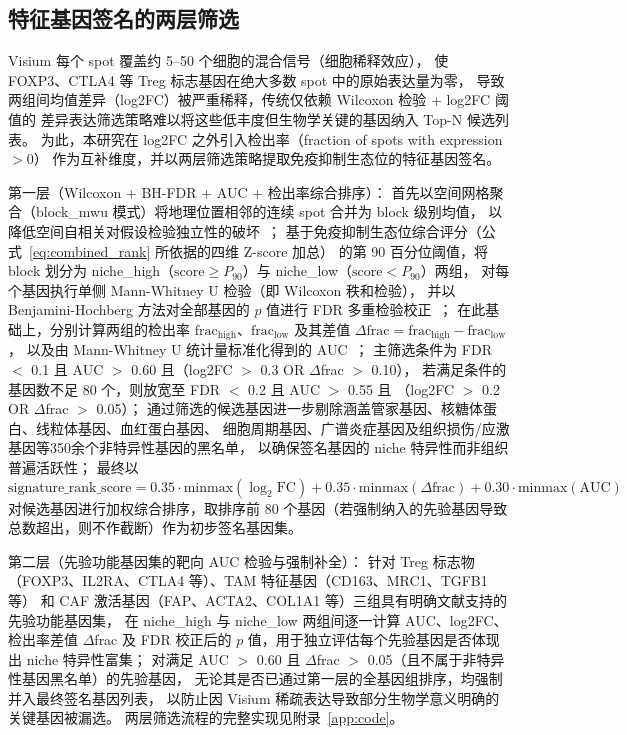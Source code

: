 \documentclass[12pt, a4paper]{ctexart}
\begin{document}
\subsection{特征基因签名的两层筛选}

Visium 每个 spot 覆盖约 5--50 个细胞的混合信号（细胞稀释效应），
使 FOXP3、CTLA4 等 Treg 标志基因在绝大多数 spot 中的原始表达量为零，
导致两组间均值差异（log2FC）被严重稀释，传统仅依赖 Wilcoxon 检验 + log2FC 阈值的
差异表达筛选策略难以将这些低丰度但生物学关键的基因纳入 Top-N 候选列表。
为此，本研究在 log2FC 之外引入检出率（fraction of spots with expression $>0$）
作为互补维度，并以两层筛选策略提取免疫抑制生态位的特征基因签名。

第一层（Wilcoxon + BH-FDR + AUC + 检出率综合排序）：
首先以空间网格聚合（block\_mwu 模式）将地理位置相邻的连续 spot 合并为 block 级别均值，
以降低空间自相关对假设检验独立性的破坏~\citep{palla2022squidpy}；
基于免疫抑制生态位综合评分（公式~\ref{eq:combined_rank} 所依据的四维 Z-score 加总）
的第 90 百分位阈值，将 block 划分为
niche\_high（$\text{score} \geq P_{90}$）与 niche\_low（$\text{score} < P_{90}$）两组，
对每个基因执行单侧 Mann-Whitney U 检验（即 Wilcoxon 秩和检验），
并以 Benjamini-Hochberg 方法对全部基因的 $p$ 值进行 FDR 多重检验校正~\citep{mann1947test}；
在此基础上，分别计算两组的检出率 $\text{frac}_{\text{high}}$、$\text{frac}_{\text{low}}$
及其差值 $\Delta\text{frac} = \text{frac}_{\text{high}} - \text{frac}_{\text{low}}$，
以及由 Mann-Whitney U 统计量标准化得到的 AUC~\citep{hanley1982meaning}；
主筛选条件为 FDR $<$ 0.1 且 AUC $>$ 0.60 且（log2FC $>$ 0.3 OR $\Delta$frac $>$ 0.10），
若满足条件的基因数不足 80 个，则放宽至 FDR $<$ 0.2 且 AUC $>$ 0.55 且
（log2FC $>$ 0.2 OR $\Delta$frac $>$ 0.05）；
通过筛选的候选基因进一步剔除涵盖管家基因、核糖体蛋白、线粒体基因、血红蛋白基因、
细胞周期基因、广谱炎症基因及组织损伤/应激基因等350余个非特异性基因的黑名单，
以确保签名基因的 niche 特异性而非组织普遍活跃性；
最终以
\begin{equation*}
\text{signature\_rank\_score} = 0.35 \cdot \text{minmax}(\log_2\text{FC}) + 0.35 \cdot \text{minmax}(\Delta\text{frac}) + 0.30 \cdot \text{minmax}(\text{AUC})
\label{eq:signature_rank_score}
\end{equation*}
对候选基因进行加权综合排序，取排序前 80 个基因（若强制纳入的先验基因导致总数超出，则不作截断）作为初步签名基因集。

第二层（先验功能基因集的靶向 AUC 检验与强制补全）：
针对 Treg 标志物（FOXP3、IL2RA、CTLA4 等）、TAM 特征基因（CD163、MRC1、TGFB1 等）
和 CAF 激活基因（FAP、ACTA2、COL1A1 等）三组具有明确文献支持的先验功能基因集，
在 niche\_high 与 niche\_low 两组间逐一计算 AUC、log2FC、检出率差值 $\Delta$frac 及
FDR 校正后的 $p$ 值，用于独立评估每个先验基因是否体现出 niche 特异性富集；
对满足 AUC $>$ 0.60 且 $\Delta$frac $>$ 0.05（且不属于非特异性基因黑名单）的先验基因，
无论其是否已通过第一层的全基因组排序，均强制并入最终签名基因列表，
以防止因 Visium 稀疏表达导致部分生物学意义明确的关键基因被漏选。
两层筛选流程的完整实现见附录~\ref{app:code}。
\end{document}
